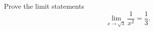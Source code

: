 \documentclass[unboxed]{hwset}
\begin{document}
\begin{problem}
	Prove the limit statements
	\begin{equation*}
		\lim_{x\to \sqrt{3}} \frac{1}{x^2} = \frac{1}{3}.
	\end{equation*}
\end{problem}
\end{document}

